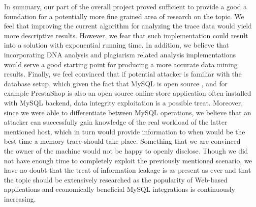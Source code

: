 \documentclass[11pt, oneside]{article}
\begin{document}
In summary, our part of the overall project proved sufficient to provide a 
good a foundation for a potentially more fine grained area of research on the 
topic. We feel that improving the current algorithm for analyzing the trace 
data would yield more descriptive results. However, we fear that such 
implementation could result into a solution with exponential running time. In 
addition, we believe that incorporating DNA analysis and plagiarism related 
analysis implementations would serve a good starting point for producing a 
more accurate data mining results. Finally, we feel convinced that if 
potential attacker is familiar with the database setup, which given the fact 
that MySQL is open source , and for example PrestaShop is also an open source 
online store application often installed with MySQL backend, data integrity 
exploitation is a possible treat. Moreover, since we were able to 
differentiate between MySQL operations, we believe that an attacker can 
successfully gain knowledge of the real workload of the latter mentioned host, 
which in turn would provide information to when would be the best time a 
memory trace should take place. Something that we are convinced the owner of 
the machine would not be happy to openly disclose. Though we did not have 
enough time to completely exploit the previously mentioned scenario, we have 
no doubt that the treat of information leakage is as present as ever and that 
the topic should be extensively researched as the popularity of Web-based 
applications and economically beneficial MySQL integrations is continuously 
increasing.
\end{document}
